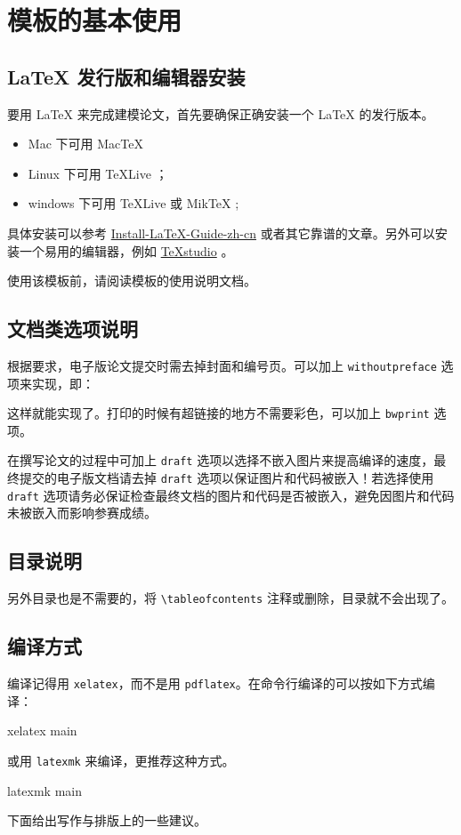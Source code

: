\section{模板的基本使用}

\subsection{LaTeX 发行版和编辑器安装}

要用 \LaTeX{} 来完成建模论文，首先要确保正确安装一个 \LaTeX{} 的发行版本。

\begin{itemize}
    \item Mac 下可用 Mac\TeX{}
    \item Linux 下可用 \TeX{}Live ；
    \item windows 下可用 \TeX{}Live 或 Mik\TeX{} ;
\end{itemize}

具体安装可以参考 \href{https://github.com/OsbertWang/install-latex-guide-zh-cn/releases/}{Install-LaTeX-Guide-zh-cn} 或者其它靠谱的文章。另外可以安装一个易用的编辑器，例如 \href{https://mirrors.tuna.tsinghua.edu.cn/github-release/texstudio-org/texstudio/LatestRelease/}{\TeX{}studio} 。

使用该模板前，请阅读模板的使用说明文档。

\subsection{文档类选项说明}

根据要求，电子版论文提交时需去掉封面和编号页。可以加上 \verb|withoutpreface|  选项来实现，即：
这样就能实现了。打印的时候有超链接的地方不需要彩色，可以加上 \verb|bwprint| 选项。

在撰写论文的过程中可加上 \verb|draft| 选项以选择不嵌入图片来提高编译的速度，最终提交的电子版文档请去掉 \verb|draft| 选项以保证图片和代码被嵌入！若选择使用 \verb|draft| 选项请务必保证检查最终文档的图片和代码是否被嵌入，避免因图片和代码未被嵌入而影响参赛成绩。

\subsection{目录说明}

另外目录也是不需要的，将 \verb|\tableofcontents| 注释或删除，目录就不会出现了。

\subsection{编译方式}

编译记得用 \verb|xelatex|，而不是用 \verb|pdflatex|。在命令行编译的可以按如下方式编译：
\begin{tcode}
  xelatex main
\end{tcode}
或用 \verb|latexmk| 来编译，更推荐这种方式。
\begin{tcode}
  latexmk main
\end{tcode}

下面给出写作与排版上的一些建议。
